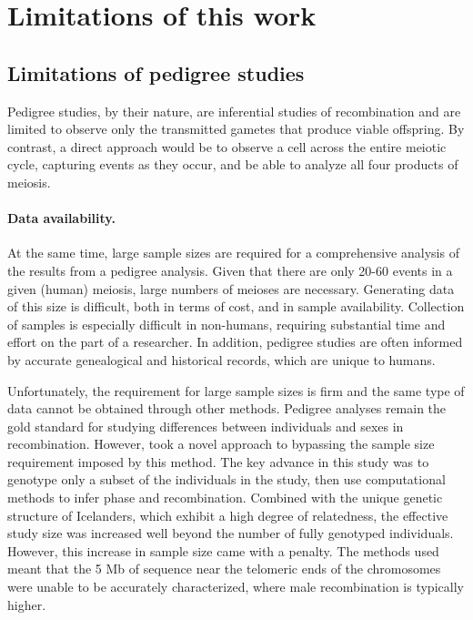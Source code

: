 \section{Limitations of this work}

\subsection{Limitations of pedigree studies}
Pedigree studies, by their nature, are inferential studies of recombination and are limited to observe only the transmitted gametes that produce viable offspring.
By contrast, a direct approach would be to observe a cell across the entire meiotic cycle, capturing events as they occur, and be able to analyze all four products of meiosis.

\paragraph{Data availability.}
At the same time, large sample sizes are required for a comprehensive analysis of the results from a pedigree analysis.
Given that there are only 20-60 events in a given (human) meiosis\cite{Broman1998,Coop2008,Kong2010}, large numbers of meioses are necessary.
Generating data of this size is difficult, both in terms of cost, and in sample availability.
Collection of samples is especially difficult in non-humans, requiring substantial time and effort on the part of a researcher.
In addition, pedigree studies are often informed by accurate genealogical and historical records, which are unique to humans.

Unfortunately, the requirement for large sample sizes is firm and the same type of data cannot be obtained through other methods.
Pedigree analyses remain the gold standard for studying differences between individuals and sexes in recombination.
However, \citet{Kong2010} took a novel approach to bypassing the sample size requirement imposed by this method.
The key advance in this study was to genotype only a subset of the individuals in the study, then use computational methods to infer phase and recombination.
Combined with the unique genetic structure of Icelanders, which exhibit a high degree of relatedness, the effective study size was increased well beyond the number of fully genotyped individuals.
However, this increase in sample size came with a penalty.
The methods used meant that the 5 Mb of sequence near the telomeric ends of the chromosomes were unable to be accurately characterized, where male recombination is typically higher.

